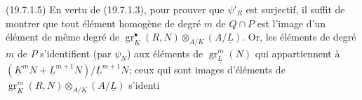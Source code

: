 (19.7.1.5) En vertu de (19.7.1.3), pour prouver que $\psi'_R$ est surjectif,
il suffit de montrer que tout élément homogène de degré $m$ de $Q\cap P$ est
l'image d'un élément de même degré de
$\operatorname{gr}_{\underline K}^\bullet(R,N)\otimes_{A/\underline K}(A/\underline L)$.
Or, les éléments
de degré $m$ de $P$ s'identifient
(par $\psi_N$) aux éléments
 de $\operatorname{gr}_{\underline L}^m(N)$
qui appartiennent à
$(\underline K^mN+\underline L^{m+1}N)/\underline L^{m+1}N$; ceux
qui sont images d'éléments  de
$\operatorname{gr}_{\underline K}^m(R,N)\otimes_{A/\underline K}(A/\underline L)$ s'identi
